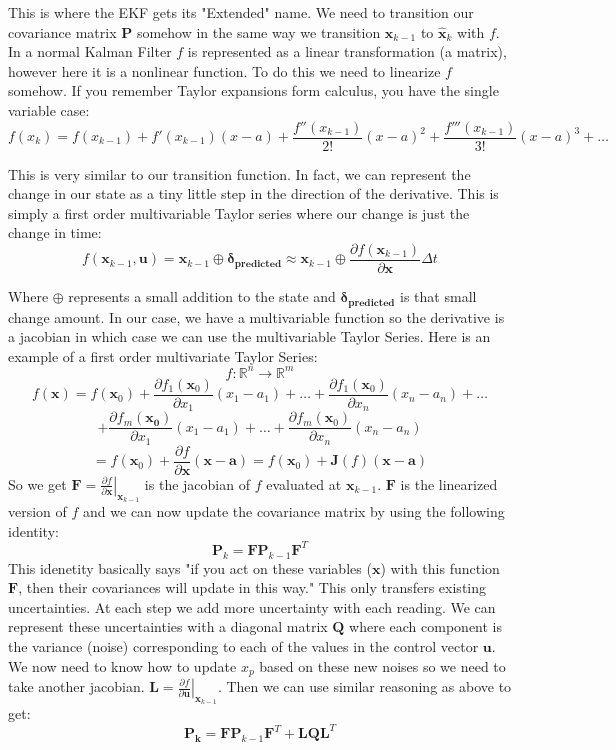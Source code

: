 \documentclass[11pt]{article}
\newcommand{\R}{\mathbb{R}}
\renewcommand{\vec}[1]{\mathbf{#1}}
\renewcommand{\tilde}[1]{\expandafter\hat{#1}}
\newcommand{\mat}[1]{\mathbf{#1}}
\begin{document}
This is where the EKF gets its "Extended" name. We need to transition our covariance matrix $\mat{P}$ somehow in the same way we transition $\vec{x}_{k-1}$ to $\vec{\tilde{x}}_k$ with $f$. In a normal Kalman Filter $f$ is represented as a linear transformation (a matrix), however here it is a nonlinear function. To do this we need to linearize $f$ somehow. If you remember Taylor expansions form calculus, you have the single variable case:
$$f(x_k) = f(x_{k-1}) + f'(x_{k-1})(x-a) + \frac{f''(x_{k-1})}{2!}(x-a)^2 + \frac{f'''(x_{k-1})}{3!}(x-a)^3 + \dots$$

This is very similar to our transition function. In fact, we can represent the change in our state as a tiny little step in the direction of the derivative. This is simply a first order multivariable Taylor series where our change is just the change in time:
$$f(\vec{x}_{k-1}, \vec{u}) = \vec{x}_{k-1} \oplus \vec{\delta_{predicted}} \approx \vec{x}_{k-1} \oplus \frac{\partial f(\vec{x}_{k-1})}{\partial \vec{x}}\Delta t$$


Where $\oplus$ represents a small addition to the state and $\vec{\delta_{predicted}}$ is that small change amount. In our case, we have a multivariable function so the derivative is a jacobian in which case we can use the multivariable Taylor Series. Here is an example of a first order multivariate Taylor Series:
$$f: \R^n \to \R^m$$
$$f(\vec{x}) = f(\vec{x}_0) + \frac{\partial f_1(\vec{x}_0)}{\partial x_1}(x_1 - a_1) + \dots + \frac{\partial f_1(\vec{x}_0)}{\partial x_n}(x_n - a_n) + \dots $$ 
$$+ \frac{\partial f_m(\vec{x_0})}{\partial x_1}(x_1 - a_1) + \dots + \frac{\partial f_m(\vec{x}_0)}{\partial x_n}(x_n - a_n)$$
$$= f(\vec{x}_0) + \frac{\partial f}{\partial \vec{x}}(\vec{x}- \vec{a}) = f(\vec{x}_0) + \mat{J}(f)(\vec{x}-\vec{a})$$
So we get $\mat{F} = \left.\frac{\partial f}{\partial \vec{x}}\right|_{\vec{x}_{k-1}}$ is the jacobian of $f$ evaluated at $\vec{x}_{k-1}$. $\mat{F}$ is the linearized version of $f$ and we can now update the covariance matrix by using the following identity:
$$\mat{P}_{k} = \mat{F} \mat{P}_{k-1} \mat{F}^T$$
This idenetity basically says "if you act on these variables ($\vec{x}$) with this function $\mat{F}$, then their covariances will update in this way." This only transfers existing uncertainties. At each step we add more uncertainty with each reading. We can represent these uncertainties with a diagonal matrix $\mat{Q}$ where each component is the variance (noise) corresponding to each of the values in the control vector $\vec{u}$. We now need to know how to update $x_p$ based on these new noises so we need to take another jacobian.
$\mat{L} = \left.\frac{\partial f}{\partial \vec{u}}\right|_{\vec{x}_{k-1}}$. Then we can use similar reasoning as above to get:
$$\mat{P_k} = \mat{F} \mat{P}_{k-1} \mat{F}^T + \mat{L} \mat{Q} \mat{L}^T$$
\end{document}
